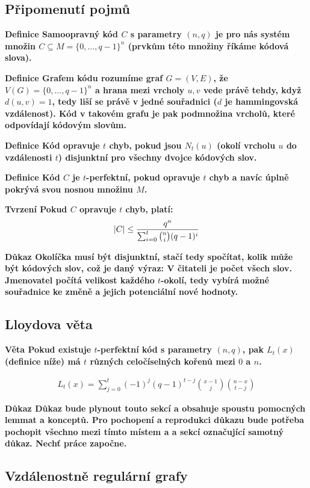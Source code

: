 \documentclass[a4paper,12pt,titlepage]{article}
\newcommand{\dk}{\smallskip\noindent\bf Důkaz\rm{} }
\newcommand{\df}{\smallskip\noindent\bf Definice\rm{} }
\newcommand{\vt}{\smallskip\noindent\bf Věta\rm{} }
\newcommand{\tv}{\smallskip\noindent\bf Tvrzení\rm{} }
\begin{document}
\subsection{Připomenutí pojmů}

\df Samoopravný kód $C$ s parametry $(n,q)$ je pro nás systém množin $C \subseteq M = \{0, \ldots, q-1\}^n$ (prvkům této množiny říkáme kódová slova).

\df Grafem kódu rozumíme graf $G=(V,E)$, že $V(G) = \{0, \ldots, q-1 \}^n$ a hrana mezi vrcholy $u,v$ vede právě tehdy, když $d(u,v) = 1$, tedy liší se právě v jedné souřadnici ($d$ je hammingovská vzdálenost). Kód v takovém grafu je pak podmnožina vrcholů, které odpovídají kódovým slovům.

\df Kód opravuje $t$ chyb, pokud jsou $N_t(u)$ (okolí vrcholu $u$ do vzdálenosti $t$) disjunktní pro všechny dvojce kódových slov.

\df Kód $C$ je $t$-perfektní, pokud opravuje $t$ chyb a navíc úplně pokrývá svou nosnou množinu $M$.

\tv Pokud $C$ opravuje $t$ chyb, platí:
\begin{align*}
	|C| \leq { q^n \over \sum_{i=0}^t \binom{n}{i} (q-1)^i }
\end{align*}

\dk Okolíčka musí být disjunktní, stačí tedy spočítat, kolik může být kódových
slov, což je daný výraz: V čitateli je počet všech slov. Jmenovatel počítá
velikost každého $t$-okolí, tedy vybírá možné souřadnice ke změně a jejich
potenciální nové hodnoty.


\subsection{Lloydova věta}

\vt Pokud existuje $t$-perfektní kód s parametry $(n,q)$, pak $L_t(x)$ (definice níže) má $t$ různých celočíselných kořenů mezi $0$ a $n$.

\begin{align}
	L_t(x) = \sum_{j=0}^t(-1)^j(q-1)^{t-j}\binom{x-1}{j}\binom{n-x}{t-j}
\end{align}

\dk Důkaz bude plynout touto sekcí a obsahuje spoustu pomocných lemmat a konceptů. Pro pochopení a reprodukci důkazu bude potřeba pochopit všechno mezi tímto místem a a sekcí označující samotný důkaz. Nechť práce započne.

\subsection{Vzdálenostně regulární grafy}
\end{document}
